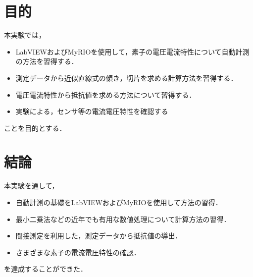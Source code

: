 \documentclass[11pt,dvipdfmx]{ujarticle}
\begin{document}
\begin{jikkenTitle}
\end{jikkenTitle}

\section{目的}
本実験では，
\begin{itemize}
	\item LabVIEWおよびMyRIOを使用して，素子の電圧電流特性について自動計測の方法を習得する．
	\item 測定データから近似直線式の傾き，切片を求める計算方法を習得する．
	\item 電圧電流特性から抵抗値を求める方法について習得する．
	\item 実験による，センサ等の電流電圧特性を確認する
\end{itemize}
ことを目的とする．












\clearpage
\section{結論}
本実験を通して，
\begin{itemize}
	\item 自動計測の基礎をLabVIEWおよびMyRIOを使用して方法の習得．
	\item 最小二乗法などの近年でも有用な数値処理について計算方法の習得．
	\item 間接測定を利用した，測定データから抵抗値の導出．
	\item さまざまな素子の電流電圧特性の確認．
\end{itemize}
を達成することができた．

\newpage
\printbibliography[title=参考文献]
\end{document}
